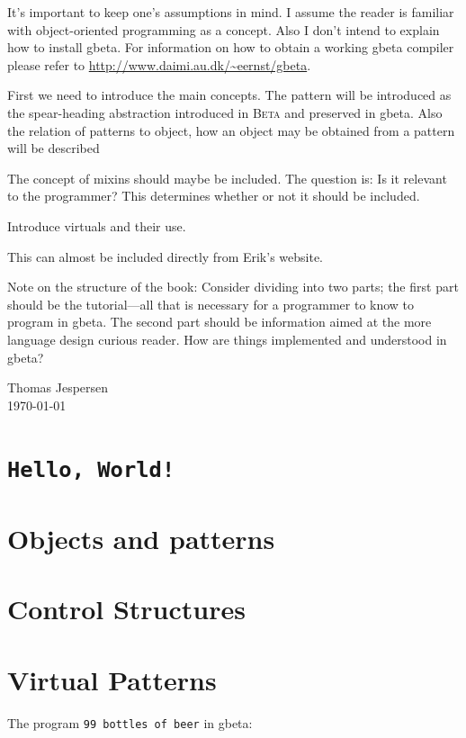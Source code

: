 \documentclass[openany]{memoir}
\newcommand{\gbeta}{\textsf{gbeta}\xspace}
\renewcommand{\beta}{\textsc{Beta}\xspace}
\begin{document}
\begin{description}\setlength{\itemsep}{-2pt}
\item[Assumptions] It's important to keep one's assumptions in mind. I
  assume the reader is familiar with object-oriented programming as a
  concept. Also I don't intend to explain how to install \gbeta . For
  information on how to obtain a working \gbeta compiler please refer
  to \url{http://www.daimi.au.dk/~eernst/gbeta}.
\item[Objects and Patterns] First we need to introduce the main concepts. The
  pattern will be introduced as the spear-heading abstraction
  introduced in \beta and preserved in \gbeta . Also the relation of
  patterns to object, how an object may be obtained from a pattern
  will be described
\item[Mixins] The concept of mixins should maybe be included. The
  question is: Is it relevant to the programmer? This determines
  whether or not it should be included.
\item[Virtual patterns] Introduce virtuals and their use.
\item[The fragment language] This can almost be included directly from
  Erik's website.
\end{description}

Note on the structure of the book: Consider dividing into two parts;
the first part should be the tutorial---all that is necessary for a
programmer to know to program in \gbeta . The second part should be
information aimed at the more language design curious reader. How are
things implemented and understood in \gbeta ?

\begin{flushright}
  Thomas Jespersen\\\today
\end{flushright}

\mainmatter

\chapter{\texttt{Hello, World!}}



\chapter{Objects and patterns}



\chapter{Control Structures}



\chapter{Virtual Patterns}



\newpage

The program \texttt{99 bottles of beer} in \gbeta :





\end{document}
